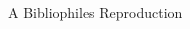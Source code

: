 \begin{titlepage}
    \begin{addmargin}[-1cm]{-3cm}
    \begin{center}
        \large

        \hfill

        \vfill

        \begingroup
            \color{Maroon} \\ \bigskip
        \endgroup


        \vfill


        A Bibliophiles Reproduction \\ \medskip

        \myTime
        

        \vfill                      

    \end{center}  
  \end{addmargin}       
\end{titlepage}   